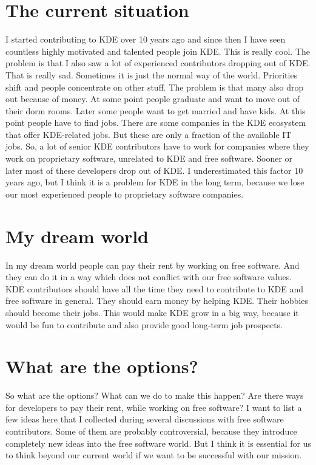 \section*{The current situation}

I started contributing to KDE over 10 years ago and since then I have seen
countless highly motivated and talented people join KDE. This is really cool.
The problem is that I also saw a lot of experienced contributors dropping out of
KDE. That is really sad. Sometimes it is just the normal way of the world.
Priorities shift and people concentrate on other stuff. The problem is that many
also drop out because of money. At some point people graduate and want to move
out of their dorm rooms. Later some people want to get married and have kids. At
this point people have to find jobs. There are some companies in the KDE
ecosystem that offer KDE-related jobs. But these are only a fraction of the
available IT jobs. So, a lot of senior KDE contributors have to work for
companies where they  work on proprietary software, unrelated to KDE and free
software. Sooner or later most of these developers drop out of KDE.
I underestimated this factor 10 years ago, but I think it is a problem for KDE
in the long term, because we lose our most experienced people to proprietary
software companies.

\section*{My dream world}

In my dream world people can pay their rent by working on free software. And
they can do it in a way which does not conflict with our free software values.
KDE contributors should have all the time they need to contribute to KDE and
free software in general. They should earn money by helping KDE. Their hobbies
should become their jobs. This would make KDE grow in a big way, because it
would be fun to contribute and also provide good long-term job prospects.  

\section*{What are the options?}

So what are the options? What can we do to make this happen? Are there ways for
developers to pay their rent, while working on free software? I want to list a
few ideas here that I collected during several discussions with free software
contributors. Some of them are probably controversial, because they introduce
completely new ideas into the free software world. But I think it is essential
for us to think beyond our current world if we want to be successful with our
mission.  

